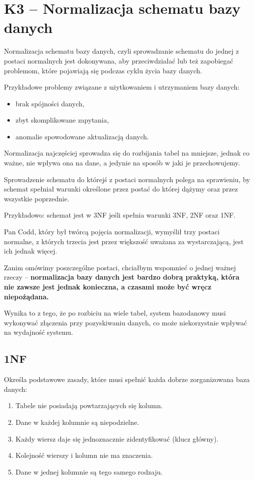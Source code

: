 \section{K3 -- Normalizacja schematu bazy danych}

Normalizacja schematu bazy danych, czyli sprowadzanie schematu do jednej z postaci normalnych jest dokonywana, aby przeciwdziałać lub też zapobiegać problemom, które pojawiają się podczas cyklu życia bazy danych.

Przykładowe problemy związane z użytkowaniem i utrzymaniem bazy danych:
\begin{itemize}
	\setlength\itemsep{1pt}
	\item{brak spójności danych,}
	\item{zbyt skomplikowane zapytania,}
	\item{anomalie spowodowane aktualizacją danych.}
\end{itemize}

Normalizacja najczęściej sprowadza się do rozbijania tabel na mniejsze, jednak co ważne, nie wpływa ona na dane, a jedynie na sposób w jaki je przechowujemy.

Sprowadzenie schematu do którejś z postaci normalnych polega na sprawieniu, by schemat spełniał warunki określone przez postać do której dążymy oraz przez wszystkie poprzednie.

Przykładowo: schemat jest w 3NF jeśli spełnia warunki 3NF, 2NF oraz 1NF.

Pan Codd, który był twórcą pojęcia normalizacji, wymyślił trzy postaci normalne, z których trzecia jest przez większość uważana za wystarczającą, jest ich jednak więcej.

Zanim omówimy poszczególne postaci, chciałbym wspomnieć o jednej ważnej rzeczy -- \textbf{normalizacja bazy danych jest bardzo dobrą praktyką, która nie zawsze jest jednak konieczna, a czasami może być wręcz niepożądana.}

Wynika to z tego, że po rozbiciu na wiele tabel, system bazodanowy musi wykonywać złączenia przy pozyskiwaniu danych, co może niekorzystnie wpływać na wydajność systemu.
\subsection*{1NF}
Określa podstawowe zasady, które musi spełnić każda dobrze zorganizowana baza danych:
\begin{enumerate}
	\item{Tabele nie posiadają powtarzających się kolumn.}
	\item{Dane w każdej kolumnie są niepodzielne.}
	\item{Każdy wiersz daje się jednoznacznie zidentyfikować (klucz główny).}
	\item{Kolejność wierszy i kolumn nie ma znaczenia.}
	\item{Dane w jednej kolumnie są tego samego rodzaju.}
\end{enumerate}


